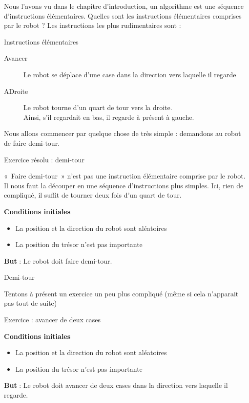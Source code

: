 	Nous l'avons vu dans le chapitre
	d'introduction, un algorithme est une séquence
	d'instructions élémentaires. Quelles sont les
	instructions élémentaires comprises par le robot ? Les instructions les
	plus rudimentaires sont :
	
	\begin{Emphase}{Instructions élémentaires}
		\begin{description}
		\item[Avancer] 
			Le robot se déplace d'une case dans
			la direction vers laquelle il regarde
		\item[ADroite]
			Le robot tourne d'un quart de tour vers la droite.\\
			Ainsi, s'il regardait en bas, il regarde à
			présent à gauche.
		\end{description}
	\end{Emphase}
	
	Nous allons commencer par quelque chose de très simple : demandons au
	robot de faire demi-tour.

	\begin{Emphase}{Exercice résolu : demi-tour}

		«~Faire demi-tour~» n'est pas une instruction
		élémentaire comprise par le robot. Il nous faut la découper en une
		séquence d'instructions plus simples. Ici, rien de
		compliqué, il suffit de tourner deux fois d'un quart
		de tour.

		\textbf{Conditions initiales}

		\begin{itemize}
		\item La position et la direction du robot sont aléatoires
		\item La position du trésor n'est pas importante
		\end{itemize}

		\textbf{But} : Le robot doit faire demi-tour.

	\end{Emphase}
	
	\begin{pseudo}{Demi-tour}
	\Begin
	\End
	\end{pseudo}

	Tentons à présent un exercice un peu plus compliqué
	(même si cela n'apparait pas tout de suite)

	\begin{Emphase}{Exercice : avancer de deux cases}

		\textbf{Conditions initiales}

		\begin{itemize}
		\item La position et la direction du robot sont aléatoires
		\item La position du trésor n'est pas importante
		\end{itemize}
		
		\textbf{But} : Le robot doit avancer de deux cases dans la direction
		vers laquelle il regarde.

	\end{Emphase}


